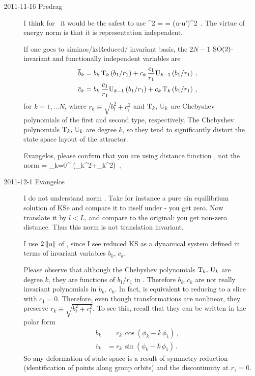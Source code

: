 \begin{description}


\label{sec:proxeq}

\item[2011-11-16 Predrag]
I think for \KS\ it would be the safest to use
\beq
  ^2  =  =
\Lint{\pSpace} ({u}-{u}')^2
\,.
\label{KSnormFr} \eeq
The virtue of energy norm is that it is representation independent.

If
one goes to siminos/ksReduced/ invariant basis, the $2N-1$
$\textrm{SO}(2)$-invariant and functionally independent variables are
\bseq\label{eq:SO2cheb}
  \begin{align}
    \overline{b}_k &=
		    b_k\, \mathrm{T}_k\left(b_1/r_1\right)+
		    c_k\,\frac{c_1}{r_1} \mathrm{U}_{k-1}\left(b_1/r_1\right)\,, \label{eq:SO2cheb1}\\
    \overline{c}_k &=
		    b_k\, \frac{c_1}{r_1} \mathrm{U}_{k-1}\left(b_1/r_1\right)+
		    c_k\,\mathrm{T}_k\left(b_1/r_1\right)\,,  \label{eq:SO2cheb2}
  \end{align}
\eseq
for $k=1,\ldots N$, where $r_k\equiv\sqrt{b_i^2+c_i^2}$ and
$\mathrm{T}_k,\,\mathrm{U}_k$ are Chebyshev polynomials of the first and second
type, respectively. The Chebyshev polynomials $\mathrm{T}_k,\,\mathrm{U}_k$ are
degree $k$, so they tend to significantly distort the state space layout
of the attractor.

Evangelos, please confirm that you are using distance function
, not the norm
\beq
{}  =   {\textstyle{}} \sum_{k=0}^{\infty}
   (_k^2+_k^2)
\,,
\label{normNotGood} \eeq

\item[2011-12-1 Evangelos] I do not understand norm .
Take for instance a pure sin equilibrium solution of KSe and compare it
to itself under  - you get zero. Now translate it by
$l<L$, and compare to the original: you get non-zero distance. Thus this
norm is not translation invariant.

I use $2\,\|{u}\|$ of , since I see reduced KS as a
dynamical system defined in terms of invariant variables
$\overline{b}_k,\,\overline{c}_k$.

Please observe that although the Chebyshev polynomials
$\mathrm{T}_k,\,\mathrm{U}_k$ are degree $k$, they are functions of $b_1/r_1$ in
. Therefore $\overline{b}_k, \overline{c}_k $ are not
really invariant polynomials in $b_k,\,c_k$. In fact, 
is equivalent to reducing to a slice with $c_1=0$. Therefore, even though
transformations  are nonlinear, they preserve
$r_k\equiv\sqrt{b_i^2+c_i^2}$. To see this, recall that they can be
written in the polar form
\bseq\label{eq:SO2polar0}
  \begin{align}
    \overline{b}_k &=
		    r_k\, \cos(\phi_k-k\,\phi_1)\,, \label{eq:SO2polar1}\\
    \overline{c}_k &=
		    r_k\, \sin(\phi_k-k\,\phi_1)\,.\label{eq:SO2polar2}
  \end{align}
\eseq
So any deformation of state space is a result of symmetry reduction
(identification of points along group orbits) and the discontinuity at
$r_1=0$.


\end{description}
